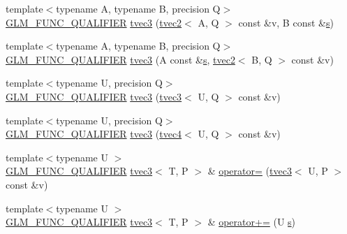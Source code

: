 \begin{DoxyCompactItemize}
\item 
{\footnotesize template$<$typename A, typename B, precision Q$>$ }\\\hyperlink{setup_8hpp_a33fdea6f91c5f834105f7415e2a64407}{G\+L\+M\+\_\+\+F\+U\+N\+C\+\_\+\+Q\+U\+A\+L\+I\+F\+I\+ER} \hyperlink{structglm_1_1detail_1_1tvec3_a3ccc7d56bdf43a20d16ea3368e068303}{tvec3} (\hyperlink{structglm_1_1detail_1_1tvec2}{tvec2}$<$ A, Q $>$ const \&v, B const \&\hyperlink{structglm_1_1detail_1_1tvec3_aa7906d8cd1a54c96ba22c1f97ebaf7cc}{s})
\item 
{\footnotesize template$<$typename A, typename B, precision Q$>$ }\\\hyperlink{setup_8hpp_a33fdea6f91c5f834105f7415e2a64407}{G\+L\+M\+\_\+\+F\+U\+N\+C\+\_\+\+Q\+U\+A\+L\+I\+F\+I\+ER} \hyperlink{structglm_1_1detail_1_1tvec3_a56aa783c0a641d602097aacf8e87f63f}{tvec3} (A const \&\hyperlink{structglm_1_1detail_1_1tvec3_aa7906d8cd1a54c96ba22c1f97ebaf7cc}{s}, \hyperlink{structglm_1_1detail_1_1tvec2}{tvec2}$<$ B, Q $>$ const \&v)
\item 
{\footnotesize template$<$typename U, precision Q$>$ }\\\hyperlink{setup_8hpp_a33fdea6f91c5f834105f7415e2a64407}{G\+L\+M\+\_\+\+F\+U\+N\+C\+\_\+\+Q\+U\+A\+L\+I\+F\+I\+ER} \hyperlink{structglm_1_1detail_1_1tvec3_a2b833d493b5fb0bece9b26743b98fa12}{tvec3} (\hyperlink{structglm_1_1detail_1_1tvec3}{tvec3}$<$ U, Q $>$ const \&v)
\item 
{\footnotesize template$<$typename U, precision Q$>$ }\\\hyperlink{setup_8hpp_a33fdea6f91c5f834105f7415e2a64407}{G\+L\+M\+\_\+\+F\+U\+N\+C\+\_\+\+Q\+U\+A\+L\+I\+F\+I\+ER} \hyperlink{structglm_1_1detail_1_1tvec3_a85838b64a93bfabb899746fc7d3a3bb1}{tvec3} (\hyperlink{structglm_1_1detail_1_1tvec4}{tvec4}$<$ U, Q $>$ const \&v)
\item 
{\footnotesize template$<$typename U $>$ }\\\hyperlink{setup_8hpp_a33fdea6f91c5f834105f7415e2a64407}{G\+L\+M\+\_\+\+F\+U\+N\+C\+\_\+\+Q\+U\+A\+L\+I\+F\+I\+ER} \hyperlink{structglm_1_1detail_1_1tvec3}{tvec3}$<$ T, P $>$ \& \hyperlink{structglm_1_1detail_1_1tvec3_addfd171b55cee5d7c2c5a1072d51ee11}{operator=} (\hyperlink{structglm_1_1detail_1_1tvec3}{tvec3}$<$ U, P $>$ const \&v)
\item 
{\footnotesize template$<$typename U $>$ }\\\hyperlink{setup_8hpp_a33fdea6f91c5f834105f7415e2a64407}{G\+L\+M\+\_\+\+F\+U\+N\+C\+\_\+\+Q\+U\+A\+L\+I\+F\+I\+ER} \hyperlink{structglm_1_1detail_1_1tvec3}{tvec3}$<$ T, P $>$ \& \hyperlink{structglm_1_1detail_1_1tvec3_aad607a9c90b9cadc7aa6c4ac048adcb7}{operator+=} (U \hyperlink{structglm_1_1detail_1_1tvec3_aa7906d8cd1a54c96ba22c1f97ebaf7cc}{s})

\end{DoxyCompactItemize}

